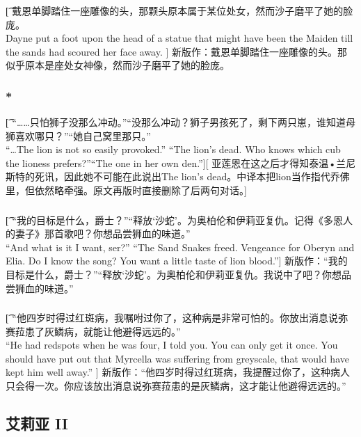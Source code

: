 \documentclass[12pt,a4paper]{article}
\begin{document}
\subsubsection{}\t[
	戴恩单脚踏住一座雕像的头，那颗头原本属于某位处女，然而沙子磨平了她的脸庞。\\
	Dayne put a foot upon the head of a statue that might have been the Maiden till the sands had scoured her face away. ]
	新版作：戴恩单脚踏住一座雕像的头。那似乎原本是座处女神像，然而沙子磨平了她的脸庞。

\subsubsection{\color{red}*}\t[
	“……只怕狮子没那么冲动。”“没那么冲动？狮子男孩死了，剩下两只崽，谁知道母狮喜欢哪只？”“她自己窝里那只。”\\
	“\ldots The lion is not so easily provoked.”
“The lion's dead. Who knows which cub the lioness prefers?”“The one in her own den.”][
亚莲恩在这之后才得知泰温•兰尼斯特的死讯，因此她不可能在此说出The lion's dead。中译本把lion当作指代乔佛里，但依然略牵强。原文再版时直接删除了后两句对话。]
	
\subsubsection{}\t[
	“我的目标是什么，爵士？”“释放‘沙蛇’。为奥柏伦和伊莉亚复仇。记得《多恩人的妻子》那首歌吧？你想品尝狮血的味道。” \\
	“And what is it I want, ser?” “The Sand Snakes freed. Vengeance for Oberyn and Elia. Do I know the song? You want a little taste of lion blood.”]
	新版作：“我的目标是什么，爵士？”“释放‘沙蛇’。为奥柏伦和伊莉亚复仇。我说中了吧？你想品尝狮血的味道。” 
	
\subsubsection{}\t[
	“他四岁时得过红斑病，我嘱咐过你了，这种病是非常可怕的。你放出消息说弥赛菈患了灰鳞病，就能让他避得远远的。” \\
	“He had redspots when he was four, I told you. You can only get it once. You should have put out that Myrcella was suffering from greyscale, that would have kept him well away.” ]
	新版作：“他四岁时得过红斑病，我提醒过你了，这种病人只会得一次。你应该放出消息说弥赛菈患的是灰鳞病，这才能让他避得远远的。”
	
\subsection{艾莉亚 II}
\end{document}
